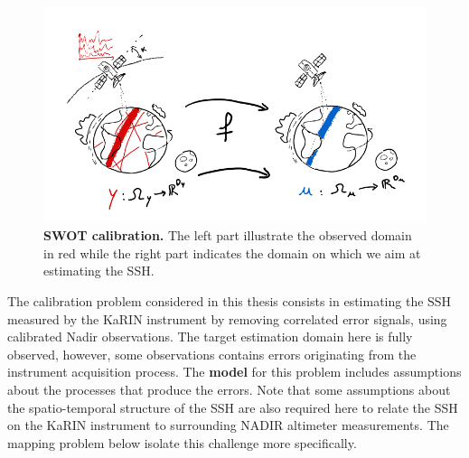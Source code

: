\begin{bibunit}
  \begin{figure}[h]
      \centering
            \includegraphics[width=\linewidth]{Introduction/pics/calib_task.png}    
      \caption{\textbf{SWOT calibration.} The left part illustrate the observed domain in red while the right part indicates the domain on which we aim at estimating the SSH.}
      \label{fig:calibration_task}
  \end{figure}
The calibration problem considered in this thesis consists in estimating the SSH measured by the KaRIN instrument by removing correlated error signals, using calibrated Nadir observations. The target estimation domain here is fully observed, however, some observations contains errors originating from the instrument acquisition process. The \textbf{model} for this problem includes assumptions about the processes that produce the errors. Note that some assumptions about the spatio-temporal structure of the SSH are also required here to relate the SSH on the KaRIN instrument to surrounding  NADIR altimeter measurements. The mapping problem below isolate this challenge more specifically.


\end{bibunit}
